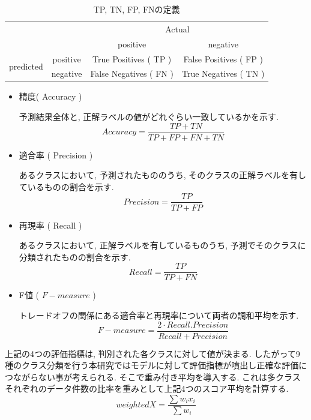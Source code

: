 \begin{table}[H]
\begin{center}
\caption{TP, TN, FP, FNの定義}
\begin{tabular}{|c|c|c|c|}
\hline
\multicolumn{2}{|c|}{\multirow{2}{*}{}} & \multicolumn{2}{c|}{Actual}                     \\ \cline{3-4} 
\multicolumn{2}{|c|}{}                  & positive               & negative               \\ \hline
\multirow{2}{*}{predicted}  & positive  & True Positives ( TP )  & False Positives ( FP ) \\ \cline{2-4} 
                            & negative  & False Negatives ( FN ) & True Negatives ( TN )  \\ \hline
\end{tabular}
\label{tab:def_conf}
\end{center}
\end{table}

\begin{itemize}
  \item 精度( Accuracy )
 
  予測結果全体と, 正解ラベルの値がどれぐらい一致しているかを示す. 
  \begin{equation}
    {  Accuracy =\frac{T P+T N}{T P+F P+F N+T N}}
  \end{equation}
  \item 適合率 ( Precision )
  
  あるクラスにおいて, 予測されたもののうち, そのクラスの正解ラベルを有しているものの割合を示す. 
  \begin{equation}
     {  Precision =\frac{T P}{T P+F P}}
  \end{equation}
  \item 再現率 ( Recall )
  
   あるクラスにおいて, 正解ラベルを有しているものうち, 予測でそのクラスに分類されたものの割合を示す. 
  \begin{equation}
     {  Recall =\frac{T P}{T P+F N}}
  \end{equation}
  \item F値 ( $F-measure$ )
  
  トレードオフの関係にある適合率と再現率について両者の調和平均を示す. 
  \begin{equation}
     { F-measure =\frac{2 \cdot  Recall.Precision }{ Recall+Precision }}
  \end{equation}
\end{itemize}

上記の4つの評価指標は, 判別された各クラスに対して値が決まる. したがって9種のクラス分類を行う本研究ではモデルに対して評価指標が噴出し正確な評価につながらない事が考えられる. そこで重み付き平均を導入する. これは多クラスそれぞれのデータ件数の比率を重みとして上記4つのスコア平均を計算する. 
\begin{equation}
    {weighted  X =\frac{\sum w_{i} x_{i}}{\sum w_{i}}}
\end{equation}


